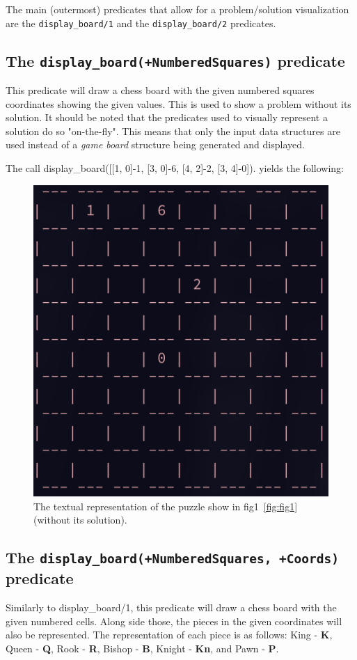 \documentclass[runningheads]{llncs}
\newcommand{\inlinecode}[1]{\texttt{#1}}
\begin{document}
The main (outermost) predicates that allow for a problem/solution visualization
are the \inlinecode{display\_board/1} and the \inlinecode{display\_board/2} predicates.

\subsection{The \inlinecode{display\_board(+NumberedSquares)} predicate}

This predicate will draw a chess board with the given numbered squares coordinates
showing the given values. This is used to show a problem without its solution. It
should be noted that the predicates used to visually represent a solution do so
"on-the-fly". This means that only the input data structures are used instead of
a \textit{game board} structure being generated and displayed.

The call display\_board([[1, 0]-1, [3, 0]-6, [4, 2]-2, [3, 4]-0]). yields the
following:
\begin{figure}[H]
  \centering
  \includegraphics[width=0.5\linewidth]{figures/display_board_1.png}
  \caption{The textual representation of the puzzle show in fig1~\ref{fig:fig1}
  (without its solution).}\label{fig2}
\end{figure}

\subsection{The \inlinecode{display\_board(+NumberedSquares, +Coords)} predicate}

Similarly to display\_board/1, this predicate will draw a chess board with the given
numbered cells. Along side those, the pieces in the given coordinates will also be
represented. The representation of each piece is as follows: King - \textbf{K},
Queen - \textbf{Q}, Rook - \textbf{R}, Bishop - \textbf{B}, Knight - \textbf{Kn},
and Pawn - \textbf{P}.
\end{document}
